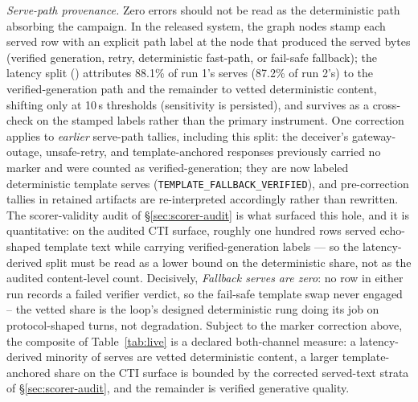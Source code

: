 \emph{Serve-path provenance.} Zero errors should not be read as the
deterministic path absorbing the campaign. In the released system, the
graph nodes stamp each served row with an explicit path label at the
node that produced the served bytes (verified generation, retry,
deterministic fast-path, or fail-safe fallback); the latency split
() attributes 88.1\% of run 1's serves
(87.2\% of run 2's) to the verified-generation path and the remainder to
vetted deterministic content, shifting only at 10\,s thresholds
(sensitivity is persisted), and survives as a cross-check on the
stamped labels rather than the primary instrument. One correction
applies to \emph{earlier} serve-path tallies, including this split:
the deceiver's gateway-outage, unsafe-retry, and template-anchored
responses previously carried no marker and were counted as
verified-generation; they are now labeled deterministic template
serves (\texttt{TEMPLATE\_FALLBACK\_VERIFIED}), and pre-correction
tallies in retained artifacts are re-interpreted accordingly rather
than rewritten. The scorer-validity audit of \S\ref{sec:scorer-audit}
is what surfaced this hole, and it is quantitative: on the audited
CTI surface, roughly one hundred rows served echo-shaped template text
while carrying verified-generation labels --- so the latency-derived
split must be read as a lower bound on the deterministic share, not as
the audited content-level count. Decisively,
\emph{Fallback serves are zero}: no row in either run records a failed
verifier verdict, so the fail-safe template swap never engaged -- the
vetted share is the loop's designed deterministic rung doing its job on
protocol-shaped turns, not degradation. Subject to the marker
correction above, the composite of Table~\ref{tab:live} is a declared
both-channel measure: a latency-derived minority of serves are vetted
deterministic content, a larger template-anchored share on the CTI
surface is bounded by the corrected served-text strata of
\S\ref{sec:scorer-audit}, and the remainder is verified generative
quality.

